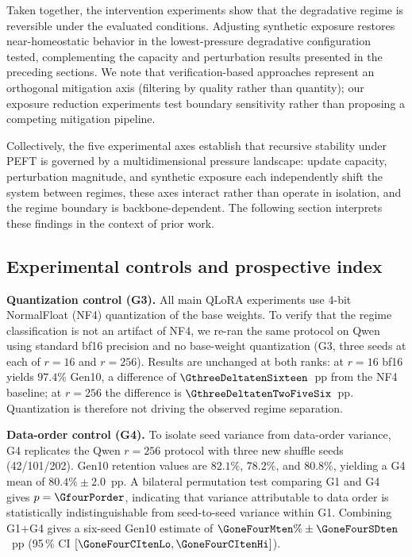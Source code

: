\documentclass[a4paper,fleqn]{cas-dc}
\newif\ifshowchanges
\newcommand{\rev}[1]{\ifshowchanges{\color{blue}#1}\else{#1}\fi}
\begin{document}
Taken together, the intervention experiments show that the degradative regime is
reversible under the evaluated conditions. Adjusting synthetic exposure restores
near-homeostatic behavior in the \rev{lowest-pressure degradative configuration tested}, complementing the
capacity and perturbation results presented in the preceding sections. We note
that verification-based approaches \citep{yi2025} represent an orthogonal
mitigation axis (filtering by quality rather than quantity); our exposure
reduction experiments test boundary sensitivity rather than proposing a
competing mitigation pipeline.

Collectively, the five experimental axes establish that recursive stability
under PEFT is governed by a multidimensional pressure landscape: update
capacity, perturbation magnitude, and synthetic exposure each independently
shift the system between regimes, these axes interact rather than operate in
isolation, and the regime boundary is backbone-dependent. The following section
interprets these findings in the context of prior work.

\subsection{Experimental controls and prospective index}\label{sec:res_controls}

\rev{\textbf{Quantization control (G3).}
All main QLoRA experiments use 4-bit NormalFloat (NF4) quantization of the base
weights. To verify that the regime classification is not an artifact of NF4, we
re-ran the same protocol on Qwen using standard bf16 precision and no base-weight
quantization (G3, three seeds at each of $r=16$ and $r=256$). Results are
unchanged at both ranks: at $r=16$ bf16 yields $97.4\%$ Gen10, a difference of
$\GthreeDeltatenSixteen$~pp from the NF4 baseline; at $r=256$ the difference is
$\GthreeDeltatenTwoFiveSix$~pp. Quantization is therefore not driving the
observed regime separation.}

\rev{\textbf{Data-order control (G4).}
To isolate seed variance from data-order variance, G4 replicates the Qwen
$r=256$ protocol with three new shuffle seeds (42/101/202). Gen10 retention
values are $82.1\%$, $78.2\%$, and $80.8\%$, yielding a G4 mean of $80.4\%\pm2.0$~pp.
A bilateral permutation test comparing G1 and G4 gives $p=\GfourPorder$, indicating
that variance attributable to data order is statistically indistinguishable from
seed-to-seed variance within G1. Combining G1$+$G4 gives a six-seed
Gen10 estimate of $\GoneFourMten\%\pm\GoneFourSDten$~pp
(95\,\% CI $[\GoneFourCItenLo, \GoneFourCItenHi]$).}
\end{document}
